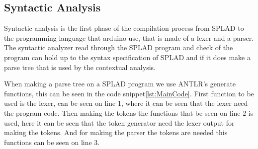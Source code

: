 \subsection{Syntactic Analysis}
Syntactic analysis is the first phase of the compilation process from SPLAD to the programming language that arduino use, that is made of a lexer and a parser. The syntactic analyzer read through the SPLAD program and check of the program can hold up to the syntax specification of SPLAD and if it does make a parse tree that is used by the contextual analysis.

When making a parse tree on a SPLAD program we use ANTLR's generate functions, this can be seen in the code snippet\ref{lst:MainCode}. First function to be used is the lexer, can be seen on line 1, where it can be seen that the lexer need the program code. Then making the tokens the functions that be seen on line 2 is used, here it can be seen that the token generator need the lexer output for making the tokens. And for making the parser the tokens are needed this functions can be seen on line 3.

